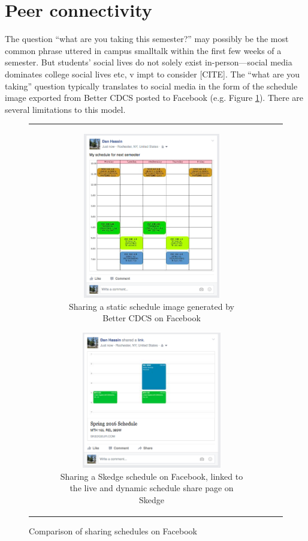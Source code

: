 
\section{Peer connectivity}

The question ``what are you taking this semester?'' may possibly be the most common phrase uttered in campus smalltalk within the first few weeks of a semester. But students' social lives do not solely exist in-person---social media dominates college social lives etc, v impt to consider [CITE]. The ``what are you taking'' question typically translates to social media in the form of the schedule image exported from Better CDCS posted to Facebook (e.g. Figure \ref{fig:cdcs-social}). There are several limitations to this model.

\begin{figure}[H]
  \centering
  \vspace{5pt}
  \begin{tabular}{c c}

    \begin{subfigure}[w]{7cm}
      \centering
      \includegraphics[width=6cm]{images/cdcs/social}
      \caption{Sharing a static schedule image generated by Better CDCS on Facebook} \label{fig:cdcs-social}
    \end{subfigure}

    \hspace{10pt}

    \begin{subfigure}[w]{7cm}
      \centering
      \includegraphics[width=6.1cm]{images/skedge/facebook}
      \caption{Sharing a Skedge schedule on Facebook, linked to the live and dynamic schedule share page on Skedge} \label{fig:sk-fb}
    \end{subfigure}

  \end{tabular}
  \caption{Comparison of sharing schedules on Facebook}
\end{figure}

